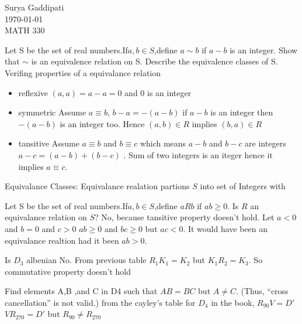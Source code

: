 \documentclass[12pt]{article}
\newenvironment{faq}{\begin{description}[style=nextline]}{\end{description}}
\begin{document}
 
Surya Gaddipati\\
\today \\
MATH 330 
\begin{faq}
\item[ Let S be the set of real numbers.If$a,b \in S$,define $a\sim b$ if $a - b$ is an integer. Show that $\sim$ is an equivalence relation on S. Describe the equivalence classes of S.]
 Verifing properties of a equivalance relation

 \begin{itemize}
   \item reflexive
     $(a,a) = a - a = 0$ and $0$ is an integer
   \item symmetric
     Assume $a \equiv b$, $b - a = -(a -b)$ if $ a -b$ is an integer then $-(a -b)$ is an integer too. Hence $(a,b)\in R$ implies $(b,a)\in R$
   \item tansitive
Assume $a \equiv b$ and  $b \equiv c$ which means $a-b$ and $b-c$ are integers  \\
$a - c = (a -b) + (b -c)$ . Sum of two integers is an iteger hence it implies $a\equiv c$.
 \end{itemize}

Equivalance Classes: Equivalance realation partions $S$ into set of Integers with 
\newline
\newline
\newline

\item[ Let S be the set of real numbers.If$a,b \in S$,define $aRb$ if $ab\geq0$. Is $R$ an equivalance relation on $S$?]
  No, because tansitive property doesn't hold. Let $a < 0$ and $b=0$ and $c > 0$  
$ab\geq0$ and $bc\geq0$ but $ac < 0$. It would have  been an equivalance realtion had it been $ab>0$.

\pagebreak
\item[Is $D_3$ albenian]
  No. From previous table $R_1K_1 = K_2$ but $K_1R_2=K_3$. So commutative property doesn't hold

\item[Find elements A,B ,and C in D4 such that $AB=BC$ but $A\neq C$. (Thus, “cross cancellation” is not valid.)]
  from the cayley's table for $D_4$ in the book, 
  $R_{90} V = D'$ \\ 
  $VR_{270} = D'$ 
  but  $R_{90} \neq R_{270}$
\end{faq}
\end{document}
